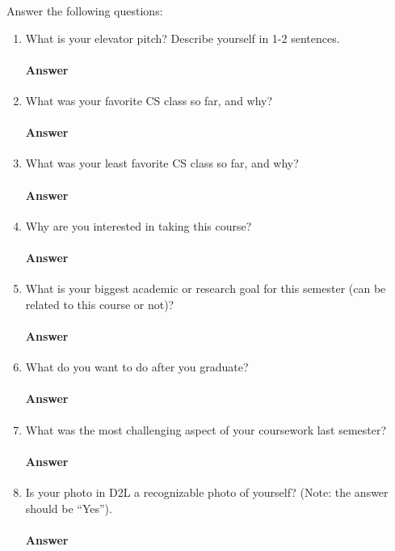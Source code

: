 \documentclass{article}
\begin{document}
Answer the following questions:
\begin{enumerate}
    \item What is your elevator pitch?  Describe yourself in 1-2
                sentences.

        \paragraph{Answer} \todo{}

     \item What was your favorite CS class so far, and why?

         \paragraph{Answer} \todo{}

     \item What was your least favorite CS class so far, and why?

         \paragraph{Answer} \todo{}
     \item Why are you interested in taking this course?

         \paragraph{Answer} \todo{}

     \item What is your biggest academic or research goal for this semester (can
         be related to this course or not)?

         \paragraph{Answer} \todo{}

     \item What do you want to do after you graduate?

         \paragraph{Answer} \todo{}

     \item What was the most challenging aspect of your coursework last semester?

         \paragraph{Answer} \todo{}

    \item Is your photo in D2L a recognizable photo of yourself?  (Note: the
        answer should be ``Yes'').

         \paragraph{Answer} \todo{}

\end{enumerate}
\end{document}
